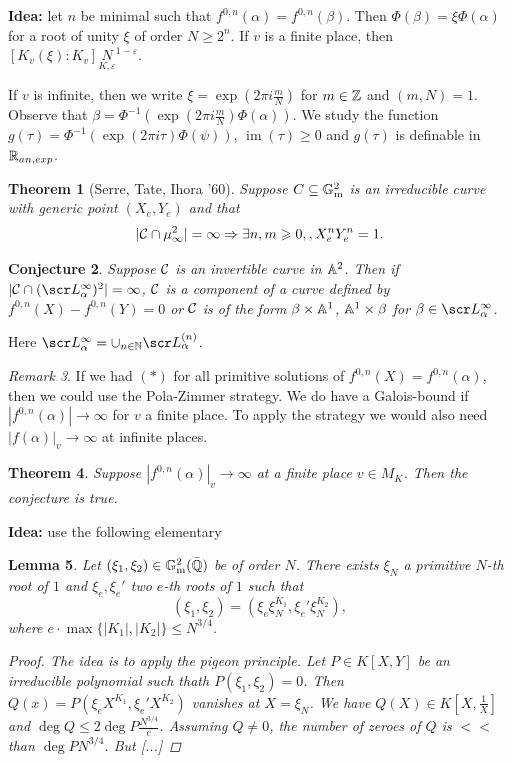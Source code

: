 \documentclass[A4paper, british]{amsart}
\theoremstyle{darkgreentheorem}
\newtheorem{thm}{Theorem}[section]
\newtheorem{lm}[thm]{Lemma}
\newtheorem{conj}[thm]{Conjecture}
\theoremstyle{darkbluedefinition}
\theoremstyle{darkredexample}
\theoremstyle{remark}
\newtheorem{rem}[thm]{Remark}
\DeclareMathOperator{\im}{im}
\newcommand{\1}{\mathbbm{1}}
\newcommand{\sub}{\subseteq}
\begin{document}
\textbf{Idea:} let $n$ be minimal such that $f^{0,n}(\alpha)=f^{0,n}(\beta)$.
Then $\Phi(\beta)=\xi \Phi(\alpha)$ for a root of unity $\xi$ of order $N\geqslant 2^{n}$.
If $v$ is a finite place, then $[K_{v}(\xi):K_{v}]\underset{K,\varepsilon} N^{1-\varepsilon}$.

If $v$ is infinite, then we write $\xi=\exp(2\pi i\frac{m}{N})$ for $m\in \mathbb{Z}$ and $(m,N)=1$.
Observe that $\beta=\Phi^{-1}(\exp(2\pi i\frac{m}{N})\Phi(\alpha))$.
We study the function $g(\tau)=\Phi^{-1}(\exp(2\pi i\tau)\Phi(\psi))$, $\im(\tau)\geqslant 0$ and $g(\tau)$ is definable in $\mathbb{R}_{an,exp}$.

\begin{thm}[Serre, Tate, Ihora '60]
    Suppose $C\sub\Gm^{2}$ is an irreducible curve with generic point $(X_{e},Y_{e})$ and that
    \[ |\mathcal{C}\cap \mu_{\infty}^{2} |=\infty \Rightarrow \exists n,m\geqslant 0,,X_{e}^{n}Y_{e}^{n}=1.\]
\end{thm}

\begin{conj}
    Suppose $\mathcal{C}$ is an invertible curve in $\mathbb{A}^{2}$.
    Then if $|\calC\cap (\L_{\alpha}^{\infty})^{2}|=\infty$, $\mathcal{C}$ is a component of a curve defined by $f^{0,n}(X)-f^{0,n}(Y)=0$ or $\mathcal{C}$ is of the form $\beta\times \mathbb{A}^{1}$, $\mathbb{A}^{1}\times \beta$ for $\beta\in\L_{\alpha}^{\infty}$.
\end{conj}

Here $\L_{\alpha}^{\infty}=\cup_{n\in\N}\L_{\alpha}^{(n)}$.

\begin{rem}
    If we had $(*)$ for all primitive solutions of $f^{0,n}(X)=f^{0,n}(\alpha)$, then we could use the Pola-Zimmer strategy.
    We do have a Galois-bound if $|f^{0,n}(\alpha)|\to \infty$ for $v$ a finite place.
    To apply the strategy we would also need $|f(\alpha)|_{v}\to \infty$ at infinite places.
\end{rem}

\begin{thm}
    Suppose $|f^{0,n}(\alpha)|_{v}\to \infty$ at a finite place $v\in M_{K}$.
    Then the conjecture is true.
\end{thm}

\textbf{Idea:} use the following elementary
\begin{lm}
    Let $(\xi_{1},\xi_{2})\in \mathbb{G}_{\mathrm{m}}^{2}(\bar{\mathbb{Q}})$ be of order $N$.
    There exists $\xi_{N}$ a primitive $N$-th root of $1$ and $\xi_{e},\xi_{e}'$ two $e$-th roots of $1$ such that
    \[ (\xi_{1},\xi_{2})=(\xi_{e}\xi_{N}^{K_{1}},\xi_{e}'\xi_{N}^{K_{2}}), \]
    where $e\cdot \max\{|K_{1}|,|K_{2}|\}\leqslant N^{3/4}$.
    \begin{proof}
	The idea is to apply the pigeon principle.
	Let $P\in K[X,Y]$ be an irreducible polynomial such thath $P(\xi_{1},\xi_{2})=0$.
	Then $Q(x)=P(\xi_{e}X^{K_{1}},\xi_{e}'X^{K_{2}})$ vanishes at $X=\xi_{N}$.
	We have $Q(X)\in K[X,\frac{1}{X}]$ and $\deg{Q}\leqslant 2\deg{P}\frac{N^{3/4}}{e}$.
	Assuming $Q\neq 0$, the number of zeroes of $Q$ is $<<$ than $\deg{P}N^{3/4}$.
	But [...]
    \end{proof}
\end{lm}
\end{document}
